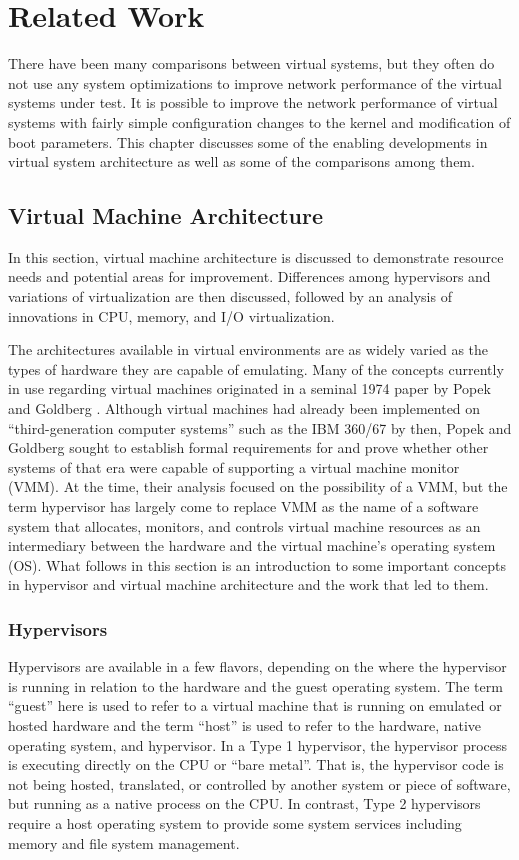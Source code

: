 \chapter{Related Work}
\label{sec:related_work}
There have been many comparisons between virtual systems, but they often do not use any system optimizations to improve network performance of the virtual systems under test.
It is possible to improve the network performance of virtual systems with fairly simple configuration changes to the kernel and modification of boot parameters.
This chapter discusses some of the enabling developments in virtual system architecture as well as some of the comparisons among them.  

\section{Virtual Machine Architecture}
\label{sec:vmarchitecture}
In this section, virtual machine architecture is discussed to demonstrate resource needs and potential areas for improvement.
Differences among hypervisors and variations of virtualization are then discussed, followed by an analysis of innovations in CPU, memory, and I/O virtualization.  

The architectures available in virtual environments are as widely varied as the types of hardware they are capable of emulating.
Many of the concepts currently in use regarding virtual machines originated in a seminal 1974 paper by Popek and Goldberg \autocite{popek1974formal}.
Although virtual machines had already been implemented on ``third-generation computer systems'' such as the IBM 360/67 by then, Popek and Goldberg sought to establish formal requirements for and prove whether other systems of that era were capable of supporting a virtual machine monitor (VMM)\autocite{popek1974formal}.
At the time, their analysis focused on the possibility of a VMM, but the term hypervisor has largely come to replace VMM as the name of a software system that allocates, monitors, and controls virtual machine resources as an intermediary between the hardware and the virtual machine's operating system (OS).
What follows in this section is an introduction to some important concepts in hypervisor and virtual machine architecture and the work that led to them.

\subsection{Hypervisors}
\label{sec:hypervisors}
Hypervisors are available in a few flavors, depending on the where the hypervisor is running in relation to the hardware and the guest operating system.
The term ``guest'' here is used to refer to a virtual machine that is running on emulated or hosted hardware and the term ``host'' is used to refer to the hardware, native operating system, and hypervisor.  
In a Type 1 hypervisor, the hypervisor process is executing directly on the CPU or ``bare metal''.
That is, the hypervisor code is not being hosted, translated, or controlled by another system or piece of software, but running as a native process on the CPU.
In contrast, Type 2 hypervisors require a host operating system to provide some system services including memory and file system management.

